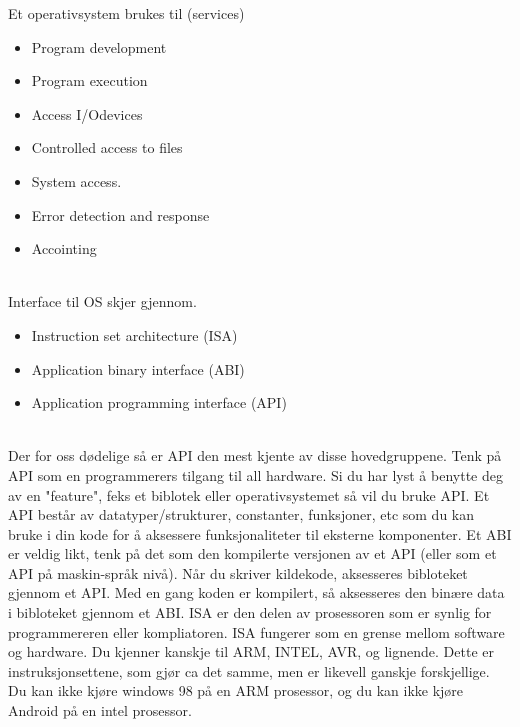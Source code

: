 Et operativsystem brukes til (services)
\begin{itemize}
\item Program development
\item Program execution
\item Access I/Odevices
\item Controlled access to files
\item System access.
\item Error detection and response
\item Accointing
\end{itemize}
~\\
\newline
Interface til OS skjer gjennom.
\begin{itemize}
\item Instruction set architecture (ISA)
\item Application binary interface (ABI)
\item Application programming interface (API)
\end{itemize}
~\\ \newline
Der for oss dødelige så er API den mest kjente av disse hovedgruppene. 
Tenk på API som en programmerers tilgang til all hardware. Si du har lyst å benytte deg av en "feature", feks et biblotek eller operativsystemet så vil du bruke API. Et API består av datatyper/strukturer, constanter, funksjoner, etc som du kan bruke i din kode for å aksessere funksjonaliteter til eksterne komponenter.
\newline
Et ABI er veldig likt, tenk på det som den kompilerte versjonen av et API (eller som et API på maskin-språk nivå). Når du skriver kildekode, aksesseres bibloteket gjennom et API. Med en gang koden er kompilert, så aksesseres den binære data i bibloteket gjennom et ABI.
\newline
ISA er den delen av prosessoren som er synlig for programmereren eller kompliatoren. ISA fungerer som en grense mellom software og hardware. Du kjenner kanskje til ARM, INTEL, AVR, og lignende. Dette er instruksjonsettene, som gjør ca det samme, men er likevell ganskje forskjellige. Du kan ikke kjøre windows 98 på en ARM prosessor, og du kan ikke kjøre Android på en intel prosessor.

